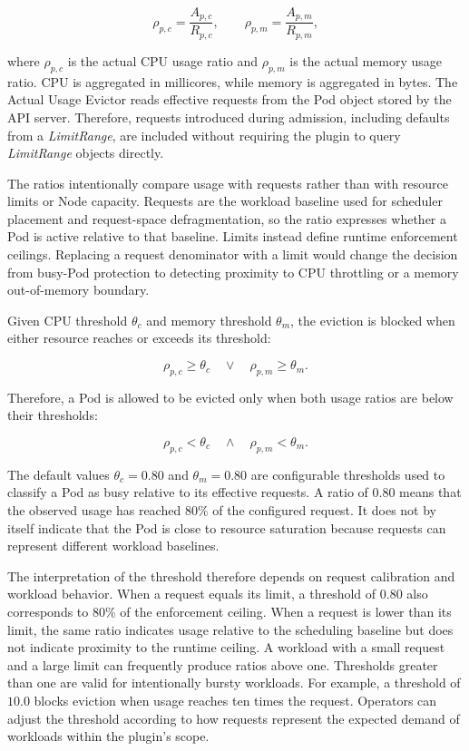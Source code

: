 \[
    \rho_{p,c} = \frac{A_{p,c}}{R_{p,c}},
    \qquad
    \rho_{p,m} = \frac{A_{p,m}}{R_{p,m}},
\]

where \(\rho_{p,c}\) is the actual CPU usage ratio and \(\rho_{p,m}\) is the actual memory usage ratio. CPU is aggregated in millicores, while memory is aggregated in bytes. The Actual Usage Evictor reads effective requests from the Pod object stored by the API server. Therefore, requests introduced during admission, including defaults from a \textit{LimitRange}, are included without requiring the plugin to query \textit{LimitRange} objects directly.

The ratios intentionally compare usage with requests rather than with resource limits or Node capacity. Requests are the workload baseline used for scheduler placement and request-space defragmentation, so the ratio expresses whether a Pod is active relative to that baseline. Limits instead define runtime enforcement ceilings. Replacing a request denominator with a limit would change the decision from busy-Pod protection to detecting proximity to CPU throttling or a memory out-of-memory boundary.

Given CPU threshold \(\theta_c\) and memory threshold \(\theta_m\), the eviction is blocked when either resource reaches or exceeds its threshold:

\[
    \rho_{p,c} \geq \theta_c
    \quad \lor \quad
    \rho_{p,m} \geq \theta_m.
\]

Therefore, a Pod is allowed to be evicted only when both usage ratios are below their thresholds:

\[
    \rho_{p,c} < \theta_c
    \quad \land \quad
    \rho_{p,m} < \theta_m.
\]

The default values \(\theta_c = 0.80\) and \(\theta_m = 0.80\) are configurable thresholds used to classify a Pod as busy relative to its effective requests. A ratio of \(0.80\) means that the observed usage has reached \(80\%\) of the configured request. It does not by itself indicate that the Pod is close to resource saturation because requests can represent different workload baselines.

The interpretation of the threshold therefore depends on request calibration and workload behavior. When a request equals its limit, a threshold of \(0.80\) also corresponds to \(80\%\) of the enforcement ceiling. When a request is lower than its limit, the same ratio indicates usage relative to the scheduling baseline but does not indicate proximity to the runtime ceiling. A workload with a small request and a large limit can frequently produce ratios above one. Thresholds greater than one are valid for intentionally bursty workloads. For example, a threshold of \(10.0\) blocks eviction when usage reaches ten times the request. Operators can adjust the threshold according to how requests represent the expected demand of workloads within the plugin's scope.

